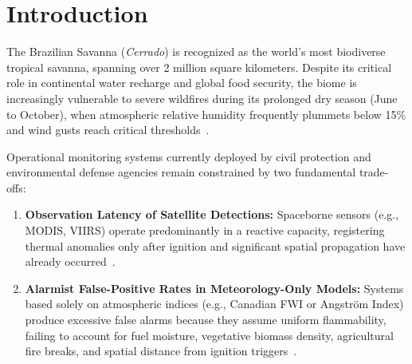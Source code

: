 \documentclass[runningheads]{llncs}
\begin{document}
\section{Introduction}
\label{sec:intro}
The Brazilian Savanna (\textit{Cerrado}) is recognized as the world's most biodiverse tropical savanna, spanning over 2 million square kilometers. Despite its critical role in continental water recharge and global food security, the biome is increasingly vulnerable to severe wildfires during its prolonged dry season (June to October), when atmospheric relative humidity frequently plummets below 15\% and wind gusts reach critical thresholds~\cite{pivello2021cerrado}.

Operational monitoring systems currently deployed by civil protection and environmental defense agencies remain constrained by two fundamental trade-offs:
\begin{enumerate}
    \item \textbf{Observation Latency of Satellite Detections:} Spaceborne sensors (e.g., MODIS, VIIRS) operate predominantly in a reactive capacity, registering thermal anomalies only after ignition and significant spatial propagation have already occurred~\cite{inpe2025}.
    \item \textbf{Alarmist False-Positive Rates in Meteorology-Only Models:} Systems based solely on atmospheric indices (e.g., Canadian FWI or Angstr\"om Index) produce excessive false alarms because they assume uniform flammability, failing to account for fuel moisture, vegetative biomass density, agricultural fire breaks, and spatial distance from ignition triggers~\cite{van2018fire}.
\end{enumerate}
\end{document}
